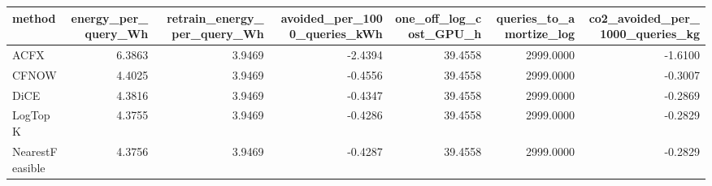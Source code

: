 \begin{tabular}{lrrrrrr}
\toprule
         method &  energy\_per\_query\_Wh &  retrain\_energy\_per\_query\_Wh &  avoided\_per\_1000\_queries\_kWh &  one\_off\_log\_cost\_GPU\_h &  queries\_to\_amortize\_log &  co2\_avoided\_per\_1000\_queries\_kg \\
\midrule
           ACFX &               6.3863 &                       3.9469 &                       -2.4394 &                 39.4558 &                2999.0000 &                          -1.6100 \\
          CFNOW &               4.4025 &                       3.9469 &                       -0.4556 &                 39.4558 &                2999.0000 &                          -0.3007 \\
           DiCE &               4.3816 &                       3.9469 &                       -0.4347 &                 39.4558 &                2999.0000 &                          -0.2869 \\
        LogTopK &               4.3755 &                       3.9469 &                       -0.4286 &                 39.4558 &                2999.0000 &                          -0.2829 \\
NearestFeasible &               4.3756 &                       3.9469 &                       -0.4287 &                 39.4558 &                2999.0000 &                          -0.2829 \\
\bottomrule
\end{tabular}
